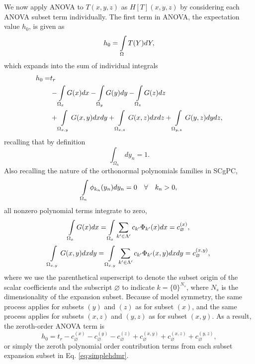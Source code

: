 We now apply ANOVA to $T(x,y,z)$ as $H[T](x,y,z)$ by considering each ANOVA subset term individually.
The first term in ANOVA, the expectation value $h_0$, is given as
\begin{equation}
  h_0 = \int\limits_{\Omega} T(Y) dY,
\end{equation}
which expands into the sum of individual integrals
\begin{align}
  h_0 =& t_r \\ \nonumber
  &- \int\limits_{\Omega_{x}} G(x) dx - \int\limits_{\Omega_{y}} G(y) dy - \int\limits_{\Omega_{z}} G(z) dz \\ \nonumber
  &+ \int\limits_{\Omega_{x,y}} G(x,y) dx dy + \int\limits_{\Omega_{x,z}} G(x,z) dx dz + \int\limits_{\Omega_{y,z}} G(y,z) dy dz,
\end{align}
recalling that by definition
\begin{equation}
\int_{\Omega_n} dy_n = 1.
\end{equation}
Also recalling the nature of the orthonormal polynomials families in SCgPC,
\begin{equation}
  \int\limits_{\Omega_n} \phi_{k_n}(y_n) dy_n = 0 \hspace{10pt}\forall\hspace{10pt} k_n>0,
\end{equation}
all nonzero polynomial terms integrate to zero,
\begin{equation}
  \int\limits_{\Omega_{x}} G(x) dx = \int\limits_{\Omega_{x}} \sum_{k'\in\Lambda'}c_{k'}\Phi_{k'}(x) dx = c_\varnothing^{(x)},
\end{equation}
\begin{equation}
  \int\limits_{\Omega_{x,y}} G(x,y) dxdy = \int\limits_{\Omega_{x,y}} \sum_{k'\in\Lambda'}c_{k'}\Phi_{k'}(x,y) dxdy = c_\varnothing^{(x,y)},
\end{equation}
where we use the parenthetical superscript to denote the subset origin of the scalar coefficients and the
subscript $\varnothing$ to indicate $k=\{0\}^{N_s}$, where $N_s$ is the dimensionality of the expansion subset.
Because of model symmetry, the same process applies for subsets $(y)$ and $(z)$ as for subset $(x)$, 
and the same process applies for
subsets $(x,z)$ and $(y,z)$ as for subset $(x,y)$.  As a result, the zeroth-order ANOVA term is
\begin{equation}
  h_0 = t_r - c_\varnothing^{(x)} - c_\varnothing^{(y)} - c_\varnothing^{(z)} + c_\varnothing^{(x,y)} +
           c_\varnothing^{(x,z)} + c_\varnothing^{(y,z)}, 
\end{equation}
or simply the zeroth polynomial order contribution terms from each subset expansion subset in Eq.
\ref{eq:simplehdmr}.

